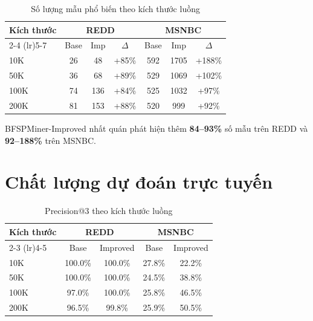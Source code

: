 \documentclass[14pt,a4paper,oneside]{extreport}
\begin{document}
\begin{table}[H]
    \centering
    \caption{Số lượng mẫu phổ biến theo kích thước luồng}
    \label{tab:patterns}
    \begin{tabular}{lcccccc}
        \toprule
        \multirow{2}{*}{\textbf{Kích thước}} & \multicolumn{3}{c}{\textbf{REDD}} & \multicolumn{3}{c}{\textbf{MSNBC}} \\
        \cmidrule(lr){2-4} \cmidrule(lr){5-7}
         & Base & Imp & $\Delta$ & Base & Imp & $\Delta$ \\
        \midrule
        10K  & 26  & 48  & +85\%  & 592  & 1705 & +188\% \\
        50K  & 36  & 68  & +89\%  & 529  & 1069 & +102\% \\
        100K & 74  & 136 & +84\%  & 525  & 1032 & +97\%  \\
        200K & 81  & 153 & +88\%  & 520  & 999  & +92\%  \\
        \bottomrule
    \end{tabular}
\end{table}

BFSPMiner-Improved nhất quán phát hiện thêm \textbf{84--93\%} số mẫu trên REDD và \textbf{92--188\%} trên MSNBC.

\section{Chất lượng dự đoán trực tuyến}

\begin{table}[H]
    \centering
    \caption{Precision@3 theo kích thước luồng}
    \label{tab:hitrate}
    \begin{tabular}{lcccc}
        \toprule
        \multirow{2}{*}{\textbf{Kích thước}} & \multicolumn{2}{c}{\textbf{REDD}} & \multicolumn{2}{c}{\textbf{MSNBC}} \\
        \cmidrule(lr){2-3} \cmidrule(lr){4-5}
         & Base & Improved & Base & Improved \\
        \midrule
        10K  & 100.0\% & 100.0\% & 27.8\% & 22.2\% \\
        50K  & 100.0\% & 100.0\% & 24.5\% & 38.8\% \\
        100K & 97.0\%  & 100.0\% & 25.8\% & 46.5\% \\
        200K & 96.5\%  & 99.8\%  & 25.9\% & 50.5\% \\
        \bottomrule
    \end{tabular}
\end{table}
\end{document}
